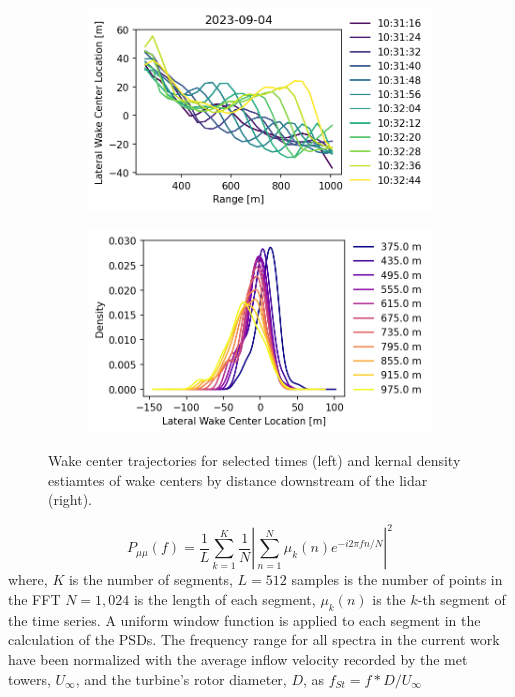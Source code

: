 \documentclass[%
 aip,
 amsmath,
 amssymb,
preprint,%
]{revtex4-2}
\begin{document}
\begin{figure}[htbp]
  \centering
  \begin{subfigure}[b]{0.48\columnwidth}
    \includegraphics[width=\columnwidth]{figs/wake_center_advection_20240925.png}
  \end{subfigure}
  \begin{subfigure}[b]{0.48\columnwidth}
    \includegraphics[width=\columnwidth]{figs/wake_center_kde_20240925.png}
  \end{subfigure}
  \caption{Wake center trajectories for selected times (left) and kernal density estiamtes of wake centers by distance downstream of the lidar (right).}
  \label{fig:lidarScanCenters}
\end{figure}


\begin{equation}
  P_{\mu\mu}(f) = \frac{1}{L} \sum_{k=1}^{K} \frac{1}{N} \left| \sum_{n=1}^{N} \mu_k(n)  e^{-i 2\pi f n / N} \right|^2  
\label{eq:psd}
\end{equation}
where, $K$ is the number of segments,
$L=512$ samples is the number of points in the FFT
$N=1,024$ is the length of each segment,
$\mu_k(n)$ is the $k$-th segment of the time series. A uniform window function is applied to each segment in the calculation of the PSDs.
The frequency range for all spectra in the current work have been normalized with the average inflow velocity recorded by the met towers, $U_\infty$, and the turbine's rotor diameter, $D$, as $f_{St} = f * D / U_\infty$
\end{document}
